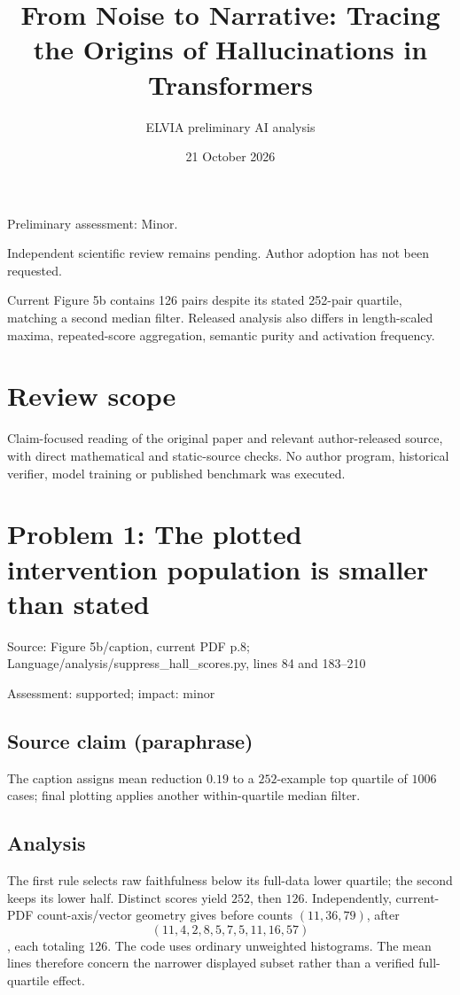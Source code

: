 \documentclass[11pt]{article}
\begin{document}
\title{From Noise to Narrative: Tracing the Origins of Hallucinations in Transformers}

\author{ELVIA preliminary AI analysis}\date{21 October 2026}\maketitle

Preliminary assessment: Minor.\par

Independent scientific review remains pending. Author adoption has not been requested.

Current Figure 5b contains 126 pairs despite its stated 252-pair quartile, matching a second median filter. Released analysis also differs in length-scaled maxima, repeated-score aggregation, semantic purity and activation frequency.

\section*{Review scope}

Claim-focused reading of the original paper and relevant author-released source, with direct mathematical and static-source checks. No author program, historical verifier, model training or published benchmark was executed.

\section*{Problem 1: The plotted intervention population is smaller than stated}

Source: Figure 5b/caption, current PDF p.8; Language/analysis/suppress\_hall\_scores.py, lines 84 and 183–210

Assessment: supported; impact: minor

\subsection*{Source claim (paraphrase)}

The caption assigns mean reduction \(0.19\) to a \(252\)-example top quartile of \(1006\) cases; final plotting applies another within-quartile median filter.

\subsection*{Analysis}

The first rule selects raw faithfulness below its full-data lower quartile; the second keeps its lower half. Distinct scores yield \(252\), then \(126\). Independently, current-PDF count-axis/vector geometry gives before counts \((11,36,79)\), after \[(11,4,2,8,5,7,5,11,16,57)\], each totaling \(126\). The code uses ordinary unweighted histograms. The mean lines therefore concern the narrower displayed subset rather than a verified full-quartile effect.
\end{document}
